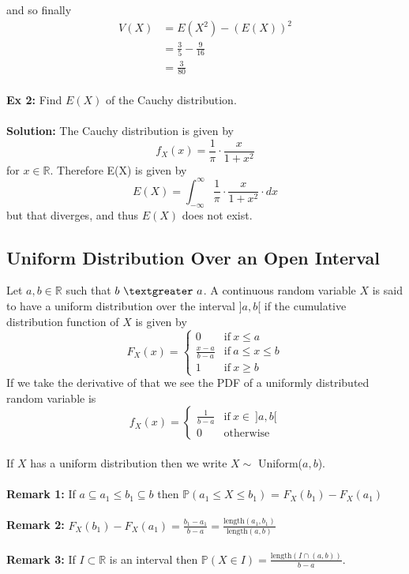 \documentclass{article}
\newcommand{\R}{\mathbb{R}}
\newcommand{\bbP}{\mathbb{P}}
\newcommand{\gt}{\textgreater}
\newcommand{\x}{\cdot}
\begin{document}
and so finally
\begin{align*}
	V(X) &= E(X^2) - (E(X))^2\\
		&= \frac{3}{5} - \frac{9}{16}\\
		&= \frac{3}{80}
\end{align*}
\ \\
\textbf{Ex 2:} Find $E(X)$ of the Cauchy distribution.\\\\
\textbf{Solution:} The Cauchy distribution is given by
\[f_{X}(x) = \frac{1}{\pi}\x \frac{x}{1+x^2}\]
for $x \in \R$. Therefore E(X) is given by
\[E(X) = \int_{-\infty}^{\infty} \frac{1}{\pi}\x \frac{x}{1+x^2}\x dx\]
but that diverges, and thus $E(X)$ does not exist.
\subsection{Uniform Distribution Over an Open Interval}
Let $a, b \in \R$ such that $b\ \gt\ a$. A continuous random variable $X$ is said to have a uniform distribution over the interval ]$a, b$[ if the cumulative distribution function of $X$ is given by
\[
F_X(x) =
\begin{cases}
	0 &\text{if}\ x \leq a\\
	\frac{x-a}{b-a} &\text{if}\ a \leq x \leq b\\
	1 &\text{if}\ x \geq b
\end{cases}
\]
If we take the derivative of that we see the PDF of a uniformly distributed random variable is
\[
f_{X}(x) =
\begin{cases}
	\frac{1}{b-a} &\text{if}\ x\in\ ]a, b[\\
	0 &\text{otherwise}
\end{cases}
\]\\
If $X$ has a uniform distribution then we write $X \sim$ Uniform($a, b$).\\\\
\textbf{Remark 1:} If $a \subseteq a_{1} \leq b_{1} \subseteq b$ then $\bbP(a_{1} \leq X \leq b_{1})$ = $F_{X}(b_{1}) - F_{X}(a_{1})$\\\\
\textbf{Remark 2:} $F_{X}(b_{1}) - F_{X}(a_{1}) = \frac{b_{1} - a_{1}}{b-a} = \frac{\text{length}(a_{1}, b_{1})}{\text{length}(a, b)}$\\\\
\textbf{Remark 3:} If $I \subset \R$ is an interval then $\bbP(X\in I) = \frac{\text{length}(I \cap (a, b))}{b-a}$.\\\\\\
\end{document}
